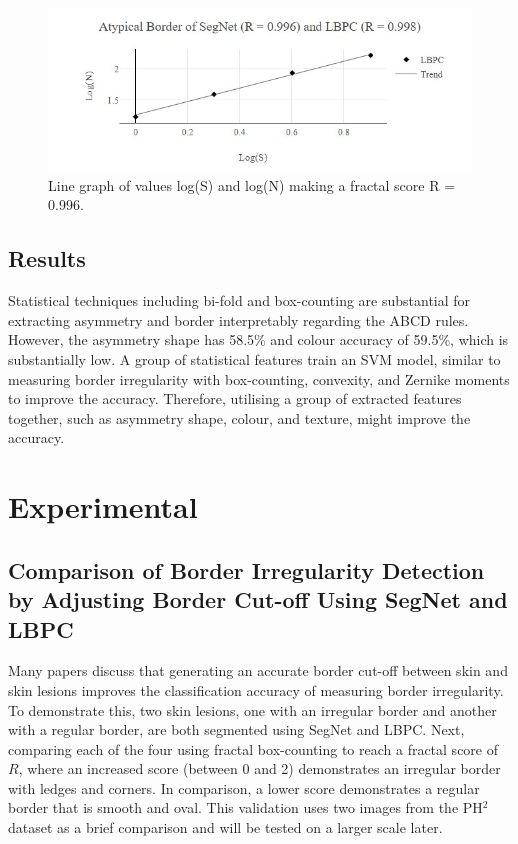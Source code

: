 \documentclass[10.5pt]{report}
\begin{document}
\begin{figure}
\centering
\includegraphics[scale=0.9]{box-counting2.jpg}
\caption{Line graph of values log(S) and log(N) making a fractal score R = 0.996.}\label{boxcounting3}
\end{figure}

\subsection{Results}
Statistical techniques including bi-fold and box-counting are substantial for extracting asymmetry and border interpretably regarding the ABCD rules. However, the asymmetry shape has 58.5\% and colour accuracy of 59.5\%, which is substantially low. A group of statistical features train an SVM model, similar to measuring border irregularity with box-counting, convexity, and Zernike moments \cite{Ali2020b} to improve the accuracy. Therefore, utilising a group of extracted features together, such as asymmetry shape, colour, and texture, might improve the accuracy.

\section{Experimental}

\subsection{Comparison of Border Irregularity Detection by Adjusting Border Cut-off Using SegNet and LBPC}

Many papers \cite{Ali2020b} discuss that generating an accurate border cut-off between skin and skin lesions improves the classification accuracy of measuring border irregularity. To demonstrate this, two skin lesions, one with an irregular border and another with a regular border, are both segmented using SegNet and LBPC. Next, comparing each of the four using fractal box-counting to reach a fractal score of $R$, where an increased score (between 0 and 2) demonstrates an irregular border with ledges and corners. In comparison, a lower score demonstrates a regular border that is smooth and oval. This validation uses two images from the PH$^2$ dataset as a brief comparison and will be tested on a larger scale later.
\end{document}
